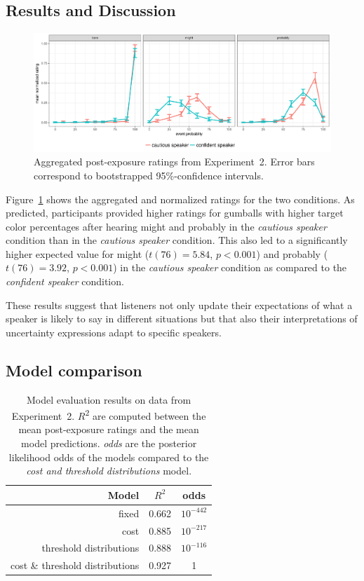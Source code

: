 \documentclass[lucida,biblatex]{sp} %
\begin{document}
\subsection{Results and Discussion}

\begin{figure}
\includegraphics[width=\textwidth]{plots/exp-2-ratings.pdf}
\caption{Aggregated post-exposure ratings from Experiment~2. Error bars correspond to bootstrapped 95\%-confidence intervals.  \label{fig:adaptation-results-comp}}
\end{figure}

Figure~\ref{fig:adaptation-results-comp} shows the aggregated and normalized ratings for the two conditions.  As predicted, participants provided higher ratings for gumballs with higher target color percentages after hearing {\sc might} and {\sc probably} in the \emph{cautious speaker} condition than in the \emph{cautious speaker} condition. This also led to a significantly higher expected value for {\sc might} ($t(76)=5.84$, $p<0.001$) and {\sc probably} ($t(76)=3.92$, $p<0.001$) in the \emph{cautious speaker} condition as compared to the \emph{confident speaker} condition.

These results suggest that listeners not only update their expectations of what a speaker is likely to say in different situations but that also their interpretations of uncertainty expressions adapt to specific speakers.

\subsection{Model comparison}

\begin{table}
\center
\begin{tabular}{r | c | c }
Model & $R^2$ &   odds  \\ \midrule
fixed & 0.662 & $10^{-442}$    \\
cost & 0.885 &  $10^{-217}$  \\
threshold distributions & 0.888 & $10^{-116}$  \\
cost \& threshold distributions & 0.927 & 1 \\
\end{tabular}
\caption{Model evaluation results on data from Experiment~2.  $R$\textsuperscript{$2$} are computed between  the mean post-exposure ratings and the mean model predictions. \textit{odds} are the posterior likelihood odds of the models compared to the \textit{cost and threshold distributions} model.  \label{tbl:model-comparison-comp}}
\end{table}
\end{document}
